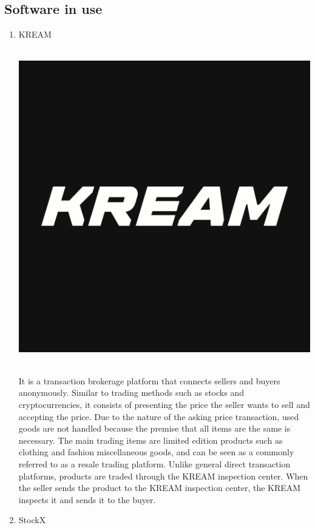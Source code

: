 \documentclass[conference]{IEEEtran}
\begin{document}
\subsection{Software in use}
\begin{enumerate}
	\item{KREAM}\\
	\\
	\centerline{\includegraphics[scale=0.2]{pics/KREAM.png}}\\
It is a transaction brokerage platform that connects sellers and buyers anonymously. Similar to trading methods such as stocks and cryptocurrencies, it consists of presenting the price the seller wants to sell and accepting the price. Due to the nature of the asking price transaction, used goods are not handled because the premise that all items are the same is necessary. The main trading items are limited edition products such as clothing and fashion miscellaneous goods, and can be seen as a commonly referred to as a resale trading platform. Unlike general direct transaction platforms, products are traded through the KREAM inspection center. When the seller sends the product to the KREAM inspection center, the KREAM inspects it and sends it to the buyer.\\
	\item{StockX}\\

\end{enumerate}
\end{document}
